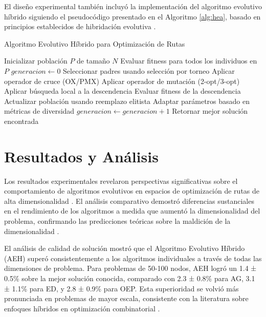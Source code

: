 \documentclass[12pt,a4paper]{article}
\begin{document}
El diseño experimental también incluyó la implementación del algoritmo evolutivo híbrido siguiendo el pseudocódigo presentado en el Algoritmo \ref{alg:hea}, basado en principios establecidos de hibridación evolutiva \cite{raidl2006unified}.

\begin{algorithm}[H]
\caption{Algoritmo Evolutivo Híbrido para Optimización de Rutas}
\label{alg:hea}
\begin{algorithmic}[1]
\STATE Inicializar población $P$ de tamaño $N$
\STATE Evaluar fitness para todos los individuos en $P$
\STATE $generacion \leftarrow 0$
    \STATE Seleccionar padres usando selección por torneo
    \STATE Aplicar operador de cruce (OX/PMX)
    \STATE Aplicar operador de mutación (2-opt/3-opt)
    \STATE Aplicar búsqueda local a la descendencia
    \STATE Evaluar fitness de la descendencia
    \STATE Actualizar población usando reemplazo elitista
    \STATE Adaptar parámetros basado en métricas de diversidad
    \STATE $generacion \leftarrow generacion + 1$
\ENDWHILE
\STATE Retornar mejor solución encontrada
\end{algorithmic}
\end{algorithm}

\section{Resultados y Análisis}

Los resultados experimentales revelaron perspectivas significativas sobre el comportamiento de algoritmos evolutivos en espacios de optimización de rutas de alta dimensionalidad \cite{potvin1996genetic}. El análisis comparativo demostró diferencias sustanciales en el rendimiento de los algoritmos a medida que aumentó la dimensionalidad del problema, confirmando las predicciones teóricas sobre la maldición de la dimensionalidad \cite{bellman1961adaptive}.

El análisis de calidad de solución mostró que el Algoritmo Evolutivo Híbrido (AEH) superó consistentemente a los algoritmos individuales a través de todas las dimensiones de problema. Para problemas de 50-100 nodos, AEH logró un 1.4 ± 0.5\% sobre la mejor solución conocida, comparado con 2.3 ± 0.8\% para AG, 3.1 ± 1.1\% para ED, y 2.8 ± 0.9\% para OEP. Esta superioridad se volvió más pronunciada en problemas de mayor escala, consistente con la literatura sobre enfoques híbridos en optimización combinatorial \cite{raidl2006unified}.
\end{document}
